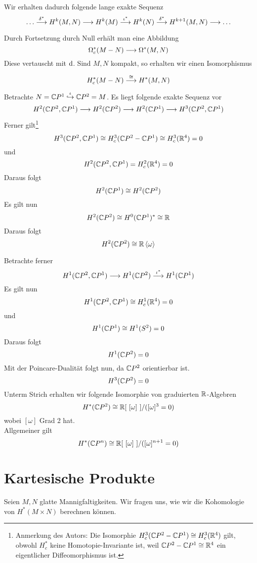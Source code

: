 Wir erhalten dadurch folgende lange exakte Sequenz
\[
\ldots \overset{\delta^*}{\longrightarrow} H^k(M,N)
\overset{  }{\longrightarrow} H^k(M)
\overset{ \iota^* }{\longrightarrow}
H^k(N)
\overset{\delta^*}{\longrightarrow} 
H^{k+1}({M,N})
\overset{  }{\longrightarrow}\ldots
\]

Durch Fortsetzung durch Null erhält man eine Abbildung
\[ \Omega^*_c(M- N ) \overset{}{\longrightarrow} \Omega^*(M,N) \]
Diese vertauscht mit $\text{d}$. Sind $M,N$ kompakt, so erhalten wir einen Isomorphismus
\[ H^*_c (M-N) \overset{\overset{}{\cong}}{\longrightarrow} H^*(M,N) \]

Betrachte $N = \mathbb{C} P^1 \overset{\iota}{\hookrightarrow} \mathbb{C} P^2 = M$. Es liegt folgende exakte Sequenz vor
\begin{align*}
H^2(\mathbb{C} P^2, \mathbb{C} P^1) \overset{}{\longrightarrow} H^2 (\mathbb{C} P^2) \overset{  }{\longrightarrow}H^2(\mathbb{C} P^1) \overset{  }{\longrightarrow}H^3(\mathbb{C} P^2 , \mathbb{C} P^1) 
\end{align*}
Ferner gilt\footnote{Anmerkung des Autors: Die Isomorphie $H^3_c(\mathbb{C} P^2 - \mathbb{C} P^1) \overset{}{\cong} H^3_c(\mathbb{R} ^4)$ gilt, obwohl $H^*_c$ keine Homotopie-Invariante ist, weil $\mathbb{C} P^2 - \mathbb{C} P^1 \overset{}{\cong} \mathbb{R} ^4$ ein eigentlicher Diffeomorphismus ist.}
\[ H^3(\mathbb{C} P^2, \mathbb{C} P^1) \overset{}{\cong} H^3_c(\mathbb{C} P^2 - \mathbb{C} P^1) \overset{}{\cong} H^3_c(\mathbb{R} ^4) = 0 \]
und
\[ H^2(\mathbb{C} P^2, \mathbb{C} P^1) = H^2_c(\mathbb{R}^4) = 0 \]
Daraus folgt
\[ H^2(\mathbb{C} P^1) \overset{}{\cong} H^2(\mathbb{C} P^2) \]
Es gilt nun
\[ H^2(\mathbb{C} P^2) \overset{}{\cong} H^0(\mathbb{C} P^1)^* \overset{}{\cong} \mathbb{R} \]
Daraus folgt
\[ H^2(\mathbb{C} P^2) \overset{}{\cong} \mathbb{R}\left<\omega\right> \]

Betrachte ferner
\[ H^1(\mathbb{C} P^2, \mathbb{C} P^1) \overset{}{\longrightarrow} H^1(\mathbb{C} P^2) \overset{\iota^*}{\longrightarrow} H^1(\mathbb{C} P^1) \]
Es gilt nun
\[ H^1(\mathbb{C} P^2, \mathbb{C} P^1) \overset{}{\cong} H^1_c(\mathbb{R}^4) = 0 \]
und
\[ H^1(\mathbb{C} P^1) \overset{}{\cong} H^1(S^2) = 0 \]
Daraus folgt
\[ H^1(\mathbb{C} P^2) = 0\]
Mit der Poincare-Dualität folgt nun, da $\mathbb{C} P^2$ orientierbar ist.
\[ H^3(\mathbb{C} P^2) = 0 \]
Unterm Strich erhalten wir folgende Isomorphie von graduierten $\mathbb{R}$-Algebren
\[ H^*(\mathbb{C} P^2) \overset{}{\cong} \mathbb{R}[~[\omega]~]/([\omega]^3 = 0) \]
wobei $[\omega]$ Grad 2 hat.\\

Allgemeiner gilt
\begin{align*}
H^*(\mathbb{C} P^n) \overset{}{\cong} \mathbb{R}[ ~[\omega]~] /([\omega]^{n+1} = 0)
\end{align*}

\section{Kartesische Produkte}
Seien $M,N$ glatte Mannigfaltigkeiten. Wir fragen uns, wie wir die Kohomologie von $H^*(M\times N)$ berechnen können.

